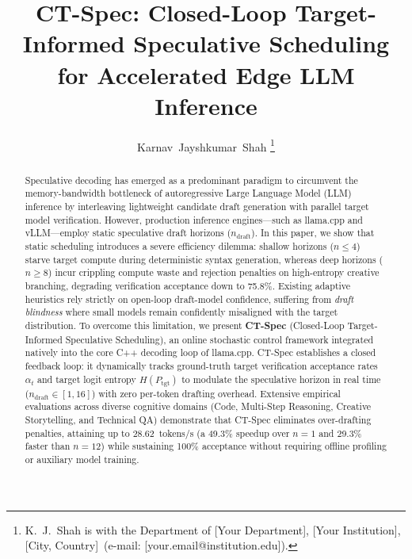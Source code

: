 \documentclass[journal,10pt,twocolumn]{IEEEtran}
\makeatletter
\newcommand{\authoraffiliation}{Department of [Your Department], [Your Institution], [City, Country]}
\newcommand{\authoremail}{[your.email@institution.edu]}
\newcommand{\code}[1]{{\ttfamily\small #1}}
\newcommand{\ctspec}{\mbox{CT-Spec}}
\makeatother
\begin{document}
\title{CT-Spec: Closed-Loop Target-Informed Speculative Scheduling for Accelerated Edge LLM Inference}

\author{Karnav~Jayshkumar~Shah%
\thanks{K.~J.~Shah is with the \authoraffiliation\ (e-mail: \authoremail).}}

\maketitle

\begin{abstract}
Speculative decoding has emerged as a predominant paradigm to circumvent the memory-bandwidth bottleneck of autoregressive Large Language Model (LLM) inference by interleaving lightweight candidate draft generation with parallel target model verification. However, production inference engines---such as \code{llama.cpp} and \code{vLLM}---employ static speculative draft horizons ($n_{\mathrm{draft}}$). In this paper, we show that static scheduling introduces a severe efficiency dilemma: shallow horizons ($n \le 4$) starve target compute during deterministic syntax generation, whereas deep horizons ($n \ge 8$) incur crippling compute waste and rejection penalties on high-entropy creative branching, degrading verification acceptance down to 75.8\%. Existing adaptive heuristics rely strictly on open-loop draft-model confidence, suffering from \textit{draft blindness} where small models remain confidently misaligned with the target distribution. To overcome this limitation, we present \textbf{\ctspec{}} (Closed-Loop Target-Informed Speculative Scheduling), an online stochastic control framework integrated natively into the core C++ decoding loop of \code{llama.cpp}. \ctspec{} establishes a closed feedback loop: it dynamically tracks ground-truth target verification acceptance rates $\alpha_t$ and target logit entropy $H(P_{\mathrm{tgt}})$ to modulate the speculative horizon in real time ($n_{\mathrm{draft}} \in [1, 16]$) with zero per-token drafting overhead. Extensive empirical evaluations across diverse cognitive domains (Code, Multi-Step Reasoning, Creative Storytelling, and Technical QA) demonstrate that \ctspec{} eliminates over-drafting penalties, attaining up to 28.62~tokens/s (a 49.3\% speedup over $n=1$ and 29.3\% faster than $n=12$) while sustaining 100\% acceptance without requiring offline profiling or auxiliary model training.
\end{abstract}
\end{document}

